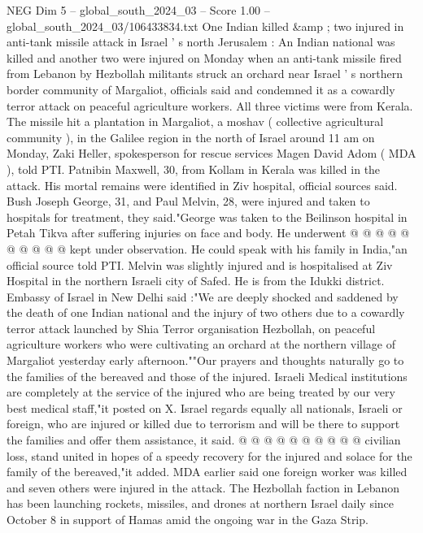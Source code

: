 \begin{textsample}{NEG Dim 5 – global\_south\_2024\_03 – Score 1.00 – global\_south\_2024\_03/106433834.txt}  \label{ex:f5_neg_206}
One Indian killed \&amp ; two injured in anti-tank missile attack in Israel ' s north Jerusalem : An Indian national was killed and another two were injured on Monday when an anti-tank missile fired from Lebanon by Hezbollah militants struck an orchard near Israel ' s northern border community of Margaliot, officials said and condemned it as a cowardly terror attack on peaceful agriculture workers.
All three victims were from Kerala.
The missile hit a plantation in Margaliot, a moshav ( collective agricultural community ), in the Galilee region in the north of Israel around 11 am on Monday, Zaki Heller, spokesperson for rescue services Magen David Adom ( MDA ), told PTI.
Patnibin Maxwell, 30, from Kollam in Kerala was killed in the attack.
His mortal remains were identified in Ziv hospital, official sources said.
Bush Joseph George, 31, and Paul Melvin, 28, were injured and taken to hospitals for treatment, they said."George was taken to the Beilinson hospital in Petah Tikva after suffering injuries on face and body.
He underwent @ @ @ @ @ @ @ @ @ @ kept under observation.
He could speak with his family in India,"an official source told PTI.
Melvin was slightly injured and is hospitalised at Ziv Hospital in the northern Israeli city of Safed.
He is from the Idukki district.
Embassy of Israel in New Delhi said :"We are deeply shocked and saddened by the death of one Indian national and the injury of two others due to a cowardly terror attack launched by Shia Terror organisation Hezbollah, on peaceful agriculture workers who were cultivating an orchard at the northern village of Margaliot yesterday early afternoon.""Our prayers and thoughts naturally go to the families of the bereaved and those of the injured.
Israeli Medical institutions are completely at the service of the injured who are being treated by our very best medical staff,"it posted on X.
Israel regards equally all nationals, Israeli or foreign, who are injured or killed due to terrorism and will be there to support the families and offer them assistance, it said. @ @ @ @ @ @ @ @ @ @ civilian loss, stand united in hopes of a speedy recovery for the injured and solace for the family of the bereaved,"it added.
MDA earlier said one foreign worker was killed and seven others were injured in the attack.
The Hezbollah faction in Lebanon has been launching rockets, missiles, and drones at northern Israel daily since October 8 in support of Hamas amid the ongoing war in the Gaza Strip.

\end{textsample}
